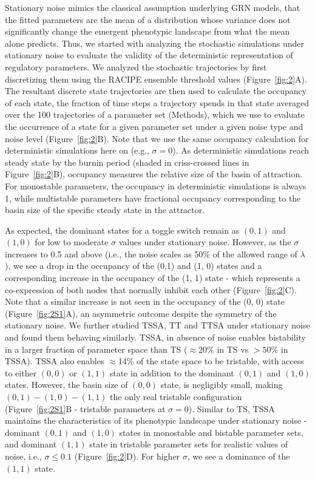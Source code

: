 \documentclass[11pt]{article}
\begin{document}
Stationary noise mimics the classical assumption underlying GRN models, that the fitted parameters are the mean of a distribution whose variance does not significantly change the emergent phenotypic landscape from what the mean alone predicts. Thus, we started with analyzing the stochastic simulations under stationary noise to evaluate the validity of the deterministic representation of regulatory parameters. We analyzed the stochastic trajectories by first discretizing them using the RACIPE ensemble threshold values (Figure~\ref{fig:2}A). The resultant discrete state trajectories are then used to calculate the occupancy of each state, the fraction of time steps a trajectory spends in that state averaged over the 100 trajectories of a parameter set (Methods), which we use to evaluate the occurrence of a state for a given parameter set under a given noise type and noise level (Figure~\ref{fig:2}B). Note that we use the same occupancy calculation for deterministic simulations here on (e.g., $\sigma = 0$). As deterministic simulations reach steady state by the burnin period (shaded in criss-crossed lines in Figure~\ref{fig:2}B), occupancy measures the relative size of the basin of attraction. For monostable parameters, the occupancy in deterministic simulations is always 1, while multistable parameters have fractional occupancy corresponding to the basin size of the specific steady state in the attractor. 

As expected, the dominant states for a toggle switch remain as $(0, 1)$ and $(1, 0)$ for low to moderate $\sigma$ values under stationary noise. However, as the $\sigma$ increases to 0.5 and above (i.e., the noise scales as 50\% of the allowed range of $\lambda$), we see a drop in the occupancy of the (0,1) and (1, 0) states and a corresponding increase in the occupancy of the (1, 1) state - which represents a co-expression of both nodes that normally inhibit each other (Figure~\ref{fig:2}C). Note that a similar increase is not seen in the occupancy of the (0, 0) state (Figure~\ref{fig:2S1}A), an asymmetric outcome despite the symmetry of the stationary noise. We further studied TSSA, TT and TTSA under stationary noise and found them behaving similarly. TSSA, in absence of noise enables bistability in a larger fraction of parameter space than TS ($\approx 20\%$ in TS vs $>50\%$ in TSSA). TSSA also enables $\approx$14\% of the state space to be tristable, with access to either $(0, 0)$ or $(1, 1)$ state in addition to the dominant $(0, 1)$ and $(1, 0)$ states. However, the basin size of $(0, 0)$ state, is negligibly small, making $(0, 1) - (1, 0)-(1, 1)$ the only real tristable configuration (Figure~\ref{fig:2S1}B - tristable parameters at $\sigma = 0$). Similar to TS, TSSA maintains the characteristics of its phenotypic landscape under stationary noise - dominant $(0,1)$ and $(1,0)$ states in monostable and bistable parameter sets, and dominant $(1, 1)$ state in tristable parameter sets for realistic values of noise, i.e., $\sigma \leq 0.1$ (Figure~\ref{fig:2}D). For higher $\sigma$, we see a dominance of the $(1, 1)$ state. 
\end{document}
